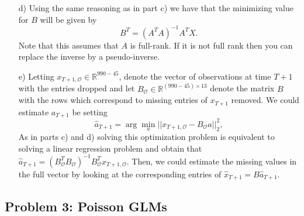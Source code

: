 \begin{enumerate}
\item[d)]
Using the same reasoning as in part c) we have that the minimizing value for $B$ will be given by
\[
B^T = (A^TA)^{-1} A^TX.
\]
Note that this assumes that $A$ is full-rank. If it is not full rank then you can replace the inverse by a pseudo-inverse.
\item[e)]
Letting $x_{T+1,\mathcal{O}}  \in \mathbb{R}^{990-45}$, denote the vector of observations at time $T+1$ with the entries dropped and let $B_{\mathcal{O}} \in \mathbb{R}^{(990-45) \times 13}$ denote the matrix $B$ with the rows which correspond to missing entries of $x_{T+1}$ removed. We could estimate $a_{T+1}$ be setting
\[
\hat{a}_{T+1} = \arg \min_{a} ||x_{T+1,\mathcal{O}} - B_{\mathcal{O}} a ||_2^2,
\]
As in parts c) and d) solving this optimization problem is equivalent to solving a linear regression problem and obtain that $\hat{a}_{T+1}=(B_{\mathcal{O}}^T B_{\mathcal{O}})^{-1} B_{\mathcal{O}}^T x_{T+1,\mathcal{O}}$. Then, we could estimate the missing values in the full vector by looking at the corresponding entries of $\hat{x}_{T+1} = B\hat{a}_{T+1}$. 
\end{enumerate}

\subsection*{Problem 3: Poisson GLMs}

